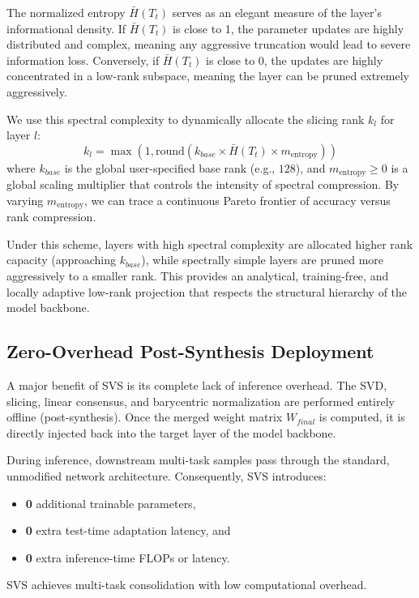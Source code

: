 The normalized entropy $\bar{H}(T_t)$ serves as an elegant measure of the layer's informational density. If $\bar{H}(T_t)$ is close to 1, the parameter updates are highly distributed and complex, meaning any aggressive truncation would lead to severe information loss. Conversely, if $\bar{H}(T_t)$ is close to 0, the updates are highly concentrated in a low-rank subspace, meaning the layer can be pruned extremely aggressively.

We use this spectral complexity to dynamically allocate the slicing rank $k_l$ for layer $l$:
\begin{equation}
    k_l = \max\left(1, \text{round}\left(k_{base} \times \bar{H}(T_t) \times m_{\text{entropy}}\right)\right)
\end{equation}
where $k_{base}$ is the global user-specified base rank (e.g., $128$), and $m_{\text{entropy}} \geq 0$ is a global scaling multiplier that controls the intensity of spectral compression. By varying $m_{\text{entropy}}$, we can trace a continuous Pareto frontier of accuracy versus rank compression. 

Under this scheme, layers with high spectral complexity are allocated higher rank capacity (approaching $k_{base}$), while spectrally simple layers are pruned more aggressively to a smaller rank. This provides an analytical, training-free, and locally adaptive low-rank projection that respects the structural hierarchy of the model backbone.

\subsection{Zero-Overhead Post-Synthesis Deployment}
A major benefit of SVS is its complete lack of inference overhead. The SVD, slicing, linear consensus, and barycentric normalization are performed entirely offline (post-synthesis). Once the merged weight matrix $W_{final}$ is computed, it is directly injected back into the target layer of the model backbone.

During inference, downstream multi-task samples pass through the standard, unmodified network architecture. Consequently, SVS introduces:
\begin{itemize}
    \item \textbf{0} additional trainable parameters,
    \item \textbf{0} extra test-time adaptation latency, and
    \item \textbf{0} extra inference-time FLOPs or latency.
\end{itemize}
SVS achieves multi-task consolidation with low computational overhead.
